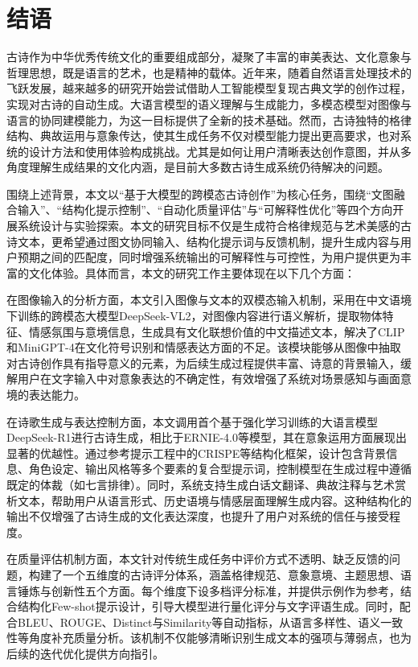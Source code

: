 
\chapter{结语}
古诗作为中华优秀传统文化的重要组成部分，凝聚了丰富的审美表达、文化意象与哲理思想，既是语言的艺术，也是精神的载体。近年来，随着自然语言处理技术的飞跃发展，越来越多的研究开始尝试借助人工智能模型复现古典文学的创作过程，实现对古诗的自动生成。大语言模型的语义理解与生成能力，多模态模型对图像与语言的协同建模能力，为这一目标提供了全新的技术基础。然而，古诗独特的格律结构、典故运用与意象传达，使其生成任务不仅对模型能力提出更高要求，也对系统的设计方法和使用体验构成挑战。尤其是如何让用户清晰表达创作意图，并从多角度理解生成结果的文化内涵，是目前大多数古诗生成系统仍待解决的问题。

围绕上述背景，本文以“基于大模型的跨模态古诗创作”为核心任务，围绕“文图融合输入”、“结构化提示控制”、“自动化质量评估”与“可解释性优化”等四个方向开展系统设计与实验探索。本文的研究目标不仅是生成符合格律规范与艺术美感的古诗文本，更希望通过图文协同输入、结构化提示词与反馈机制，提升生成内容与用户预期之间的匹配度，同时增强系统输出的可解释性与可控性，为用户提供更为丰富的文化体验。具体而言，本文的研究工作主要体现在以下几个方面：

在图像输入的分析方面，本文引入图像与文本的双模态输入机制，采用在中文语境下训练的跨模态大模型DeepSeek-VL2，对图像内容进行语义解析，提取物体特征、情感氛围与意境信息，生成具有文化联想价值的中文描述文本，解决了CLIP和MiniGPT-4在文化符号识别和情感表达方面的不足。该模块能够从图像中抽取对古诗创作具有指导意义的元素，为后续生成过程提供丰富、诗意的背景输入，缓解用户在文字输入中对意象表达的不确定性，有效增强了系统对场景感知与画面意境的表达能力。

在诗歌生成与表达控制方面，本文调用首个基于强化学习训练的大语言模型DeepSeek-R1进行古诗生成，相比于ERNIE-4.0等模型，其在意象运用方面展现出显著的优越性。通过参考提示工程中的CRISPE等结构化框架，设计包含背景信息、角色设定、输出风格等多个要素的复合型提示词，控制模型在生成过程中遵循既定的体裁（如七言排律）。同时，系统支持生成白话文翻译、典故注释与艺术赏析文本，帮助用户从语言形式、历史语境与情感层面理解生成内容。这种结构化的输出不仅增强了古诗生成的文化表达深度，也提升了用户对系统的信任与接受程度。

在质量评估机制方面，本文针对传统生成任务中评价方式不透明、缺乏反馈的问题，构建了一个五维度的古诗评分体系，涵盖格律规范、意象意境、主题思想、语言锤炼与创新性五个方面。每个维度下设多档评分标准，并提供示例作为参考，结合结构化Few-shot提示设计，引导大模型进行量化评分与文字评语生成。同时，配合BLEU、ROUGE、Distinct与Similarity等自动指标，从语言多样性、语义一致性等角度补充质量分析。该机制不仅能够清晰识别生成文本的强项与薄弱点，也为后续的迭代优化提供方向指引。

